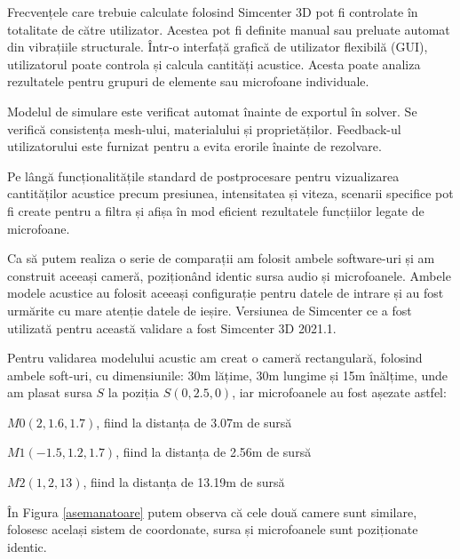 	Frecvențele care trebuie calculate folosind Simcenter 3D pot fi controlate în totalitate de către utilizator. Acestea pot fi definite manual sau preluate automat din vibrațiile structurale. Într-o interfață grafică de utilizator flexibilă (GUI), utilizatorul poate controla și calcula cantități acustice. Acesta poate analiza rezultatele pentru grupuri de elemente sau microfoane individuale.
	
	Modelul de simulare este verificat automat înainte de exportul în
	solver. Se verifică consistența mesh-ului, materialului și proprietăților. Feedback-ul utilizatorului este furnizat pentru a evita erorile înainte de rezolvare.
	
	Pe lângă funcționalitățile standard de postprocesare pentru vizualizarea
	cantităților acustice precum presiunea, intensitatea și viteza, scenarii specifice pot fi create pentru a filtra și afișa în mod eficient rezultatele funcțiilor legate de microfoane.
	
	Ca să putem realiza o serie de comparații am folosit ambele software-uri și am construit aceeași cameră, poziționând identic sursa audio și microfoanele. Ambele modele acustice au folosit aceeași configurație pentru datele de intrare și au fost urmărite cu mare atenție datele de ieșire. Versiunea de Simcenter ce a fost utilizată pentru această validare a fost Simcenter 3D 2021.1. 
	
	Pentru validarea modelului acustic am creat o cameră rectangulară, folosind ambele soft-uri, cu dimensiunile: 30m lățime, 30m lungime și 15m înălțime, unde am plasat sursa $S$ la poziția $S(0, 2.5,0)$, iar microfoanele au fost așezate astfel: 
	
	\begin{itemize}
		\utb $M0(2, 1.6, 1.7)$, fiind la distanța de 3.07m de sursă
		
		\utb $M1(-1.5, 1.2, 1.7)$, fiind la distanța de 2.56m de sursă
		
		\utb $M2(1, 2, 13)$, fiind la distanța de 13.19m de sursă
	\end{itemize}
	
	În Figura \ref{asemanatoare} putem observa că cele două camere sunt similare, folosesc același sistem de coordonate, sursa și microfoanele sunt poziționate identic.
		

